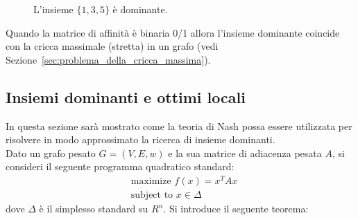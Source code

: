 \begin{figure}[h!]
    \centering
	
	\caption{L'insieme $\{1,3,5\}$ è dominante.}
\end{figure}

Quando la matrice di affinità è binaria 0/1 allora l'insieme dominante coincide con la cricca massimale (stretta) in un grafo (vedi Sezione~\ref{sec:problema_della_cricca_massima}).\\

\newpage

\subsection{Insiemi dominanti e ottimi locali} %
\label{sub:insiemi_dominanti_e_ottimi_locali}
In questa sezione sarà mostrato come la teoria di Nash possa essere utilizzata per risolvere in modo approssimato la ricerca di insieme dominanti.\\

Dato un grafo pesato $G = (V, E, w)$ e la sua matrice di adiacenza pesata $A$, si consideri il seguente programma quadratico standard:
\begin{align*}
	&\text{maximize } f(x) = x^T A x\\
	&\text{subject to } x \in \Delta
\end{align*}
dove $\Delta$ è il simplesso standard su $R^n$. Si introduce il seguente teorema:

